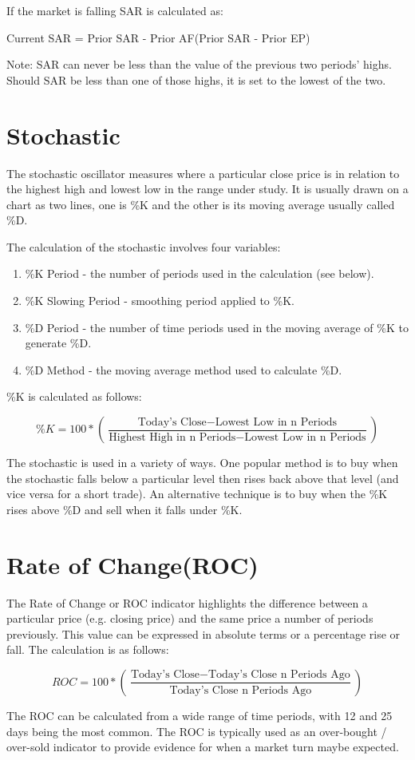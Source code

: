 If the market is falling SAR is calculated as:
\begin{center}
Current SAR = Prior SAR - Prior AF(Prior SAR - Prior EP)
\end{center}
Note:  SAR can never be less than the value of the previous two periods' highs. Should SAR be less than one of those highs, it is set to the lowest of the two.

\section{Stochastic}
\label{appB:stoch}
The stochastic oscillator measures where a particular close price is in relation to the highest high and lowest low in the range under study. It is usually drawn on a chart as two lines, one is \%K and the other is its moving average usually called \%D.

The calculation of the stochastic involves four variables:
\begin{enumerate}
\item \%K Period - the number of periods used in the calculation (see below).
\item \%K Slowing Period - smoothing period applied to \%K.
\item \%D Period - the number of time periods used in the moving average of \%K to generate \%D.
\item \%D Method - the moving average method used to calculate \%D.
\end{enumerate}

\%K is calculated as follows: 

\[ \%K = 100 * \left( \dfrac{\text{Today's Close} - \text{Lowest Low in n Periods}}{\text{Highest High in n Periods} - \text{Lowest Low in n Periods}} \right) \]

The stochastic is used in a variety of ways. One popular method is to buy when the stochastic falls below a particular level then rises back above that level (and vice versa for a short trade). An alternative technique is to buy when the \%K rises above \%D and sell when it falls under \%K.

\section{Rate of Change(ROC)}
\label{appB:roc}
The Rate of Change or ROC indicator highlights the difference between a particular price (e.g. closing price) and the same price a number of periods previously. This value can be expressed in absolute terms or a percentage rise or fall. The calculation is as follows: 

\[ ROC = 100 * \left( \dfrac{ \text{Today's Close} - \text{Today's Close n Periods Ago}}{\text{Today's Close n Periods Ago}} \right) \]

The ROC can be calculated from a wide range of time periods, with 12 and 25 days being the most common. The ROC is typically used as an over-bought / over-sold indicator to provide evidence for when a market turn maybe expected.